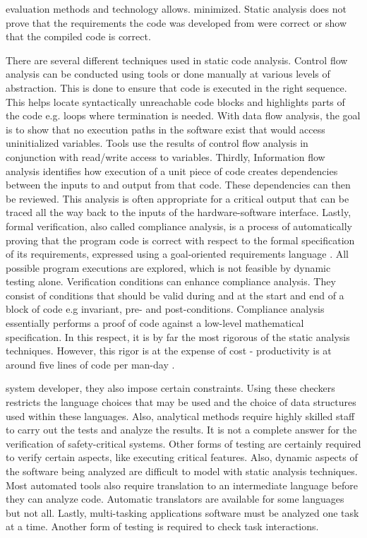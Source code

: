 evaluation methods and technology allows.
minimized. Static analysis does not prove that the requirements the code was
developed from were correct or show that the compiled code is correct.

There are several different techniques used in static code analysis. Control
flow analysis can be conducted using tools or done manually at various levels of
abstraction. This is done to ensure that code is executed in the right sequence.
This helps locate syntactically unreachable code blocks and highlights parts of
the code e.g. loops where termination is needed. With data flow analysis, the
goal is to show that no execution paths in the software exist that would access
uninitialized variables. Tools use the results of control flow analysis in
conjunction with read/write access to variables. Thirdly, Information flow
analysis identifies how execution of a unit piece of code creates dependencies
between the inputs to and output from that code. These dependencies can then be
reviewed. This analysis is often appropriate for a critical output that can be
traced all the way back to the inputs of the hardware-software interface.
Lastly, formal verification, also called compliance analysis, is a process of
automatically proving that the program code is correct with respect to the
formal specification of its requirements, expressed using a goal-oriented
requirements language \cite{5328605}. All possible program executions are
explored, which is not feasible by dynamic testing alone. Verification
conditions can enhance compliance analysis. They consist of conditions that
should be valid during and at the start and end of a block of code e.g
invariant, pre- and post-conditions. Compliance analysis essentially performs a
proof of code against a low-level mathematical specification. In this respect,
it is by far the most rigorous of the static analysis techniques. However, this
rigor is at the expense of cost - productivity is at around five lines of code
per man-day \cite{german2003software}.

system developer, they also impose certain constraints. Using these checkers
restricts the language choices that may be used and the choice of data
structures used within these languages. Also, analytical methods require highly
skilled staff to carry out the tests and analyze the results. It is not a
complete answer for the verification of safety-critical systems. Other forms of
testing are certainly required to verify certain aspects, like executing
critical features. Also, dynamic aspects of the software being analyzed are
difficult to model with static analysis techniques. Most automated tools also
require translation to an intermediate language before they can analyze code.
Automatic translators are available for some languages but not all. Lastly,
multi-tasking applications software must be analyzed one task at a time. Another
form of testing is required to check task interactions.

